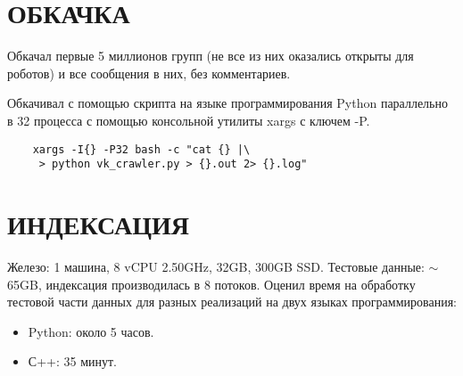 \documentclass[14pt, a4paper]{extreport}
\title{}
\date{}
\begin{document}
\pagestyle{plain}

\renewcommand\abstractname{\MakeTextUppercase{Реферат}}



\newpage
\vspace*{-25mm}
\tableofcontents
\newpage


\chapter{\MakeTextUppercase{Обкачка}}
Обкачал первые 5 миллионов групп (не все из них оказались открыты для роботов)
и все сообщения в них, без комментариев. 

Обкачивал с помощью скрипта на языке программирования Python параллельно
в 32 процесса с помощью консольной утилиты xargs с ключем -P.

\begin{verbatim}
    xargs -I{} -P32 bash -c "cat {} |\
     > python vk_crawler.py > {}.out 2> {}.log"
\end{verbatim}

\chapter{\MakeTextUppercase{Индексация}}
Железо: 1 машина, 8 vCPU 2.50GHz, 32GB, 300GB SSD.
Тестовые данные: $\sim$ 65GB, индексация производилась в 8 потоков.
Оценил время на обработку тестовой части данных для разных реализаций
на двух языках программирования:

\begin{itemize}
  \item Python: около 5 часов.
  \item С++: 35 минут.
\end{itemize}
\end{document}
